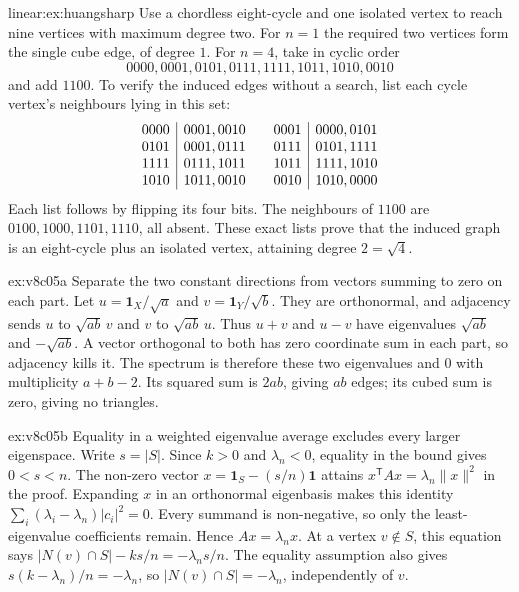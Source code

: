 \begin{solution}{linear:ex:huangsharp}
\idea Use a chordless eight-cycle and one isolated vertex to reach nine vertices with maximum degree two.
\writeup For $n=1$ the required two vertices form the single cube edge, of degree $1$. For $n=4$, take in cyclic order
\[
0000,0001,0101,0111,1111,1011,1010,0010
\]
and add $1100$. To verify the induced edges without a search, list each cycle vertex's neighbours lying in this set:
\[
\begin{array}{c|c@{\qquad}c|c}
0000&0001,0010&0001&0000,0101\\
0101&0001,0111&0111&0101,1111\\
1111&0111,1011&1011&1111,1010\\
1010&1011,0010&0010&1010,0000
\end{array}
\]
Each list follows by flipping its four bits. The neighbours of $1100$ are $0100,1000,1101,1110$, all absent. These exact lists prove that the induced graph is an eight-cycle plus an isolated vertex, attaining degree $2=\sqrt4$.
\end{solution}

\begin{solution}{ex:v8c05a}
\idea Separate the two constant directions from vectors summing to zero on each part.
\writeup Let $u=\mathbf1_X/\sqrt a$ and $v=\mathbf1_Y/\sqrt b$. They are orthonormal, and adjacency sends $u$ to $\sqrt{ab}\,v$ and $v$ to $\sqrt{ab}\,u$. Thus $u+v$ and $u-v$ have eigenvalues $\sqrt{ab}$ and $-\sqrt{ab}$. A vector orthogonal to both has zero coordinate sum in each part, so adjacency kills it. The spectrum is therefore these two eigenvalues and $0$ with multiplicity $a+b-2$. Its squared sum is $2ab$, giving $ab$ edges; its cubed sum is zero, giving no triangles.
\end{solution}

\begin{solution}{ex:v8c05b}
\idea Equality in a weighted eigenvalue average excludes every larger eigenspace.
\writeup Write $s=|S|$. Since $k>0$ and $\lambda_n<0$, equality in the bound gives $0<s<n$. The non-zero vector $x=\mathbf1_S-(s/n)\mathbf1$ attains $x^{\mathsf T}Ax=\lambda_n\|x\|^2$ in the proof. Expanding $x$ in an orthonormal eigenbasis makes this identity
$\sum_i(\lambda_i-\lambda_n)|c_i|^2=0$.
Every summand is non-negative, so only the least-eigenvalue coefficients remain. Hence $Ax=\lambda_nx$.
At a vertex $v\notin S$, this equation says
$|N(v)\cap S|-ks/n=-\lambda_ns/n$.
The equality assumption also gives $s(k-\lambda_n)/n=-\lambda_n$, so $|N(v)\cap S|=-\lambda_n$, independently of $v$.
\end{solution}

